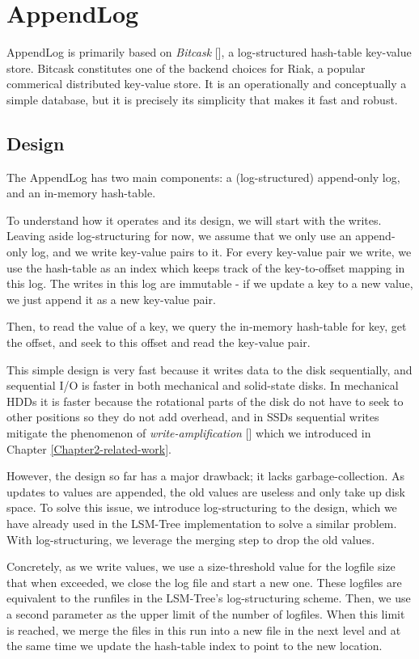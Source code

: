 \section{AppendLog}

AppendLog is primarily based on \textit{Bitcask} [\cite{bitcask}], a log-structured hash-table key-value store. Bitcask constitutes one of the backend choices for Riak, a popular commerical distributed key-value store. It is an operationally and conceptually a simple database, but it is precisely its simplicity that makes it fast and robust.

\subsection{Design}

The AppendLog has two main components: a (log-structured) append-only log, and an in-memory hash-table.

To understand how it operates and its design, we will start with the writes.
Leaving aside log-structuring for now, we assume that we only use an append-only log, and we write key-value pairs to it.
For every key-value pair we write, we use the hash-table as an index which keeps track of the key-to-offset mapping in this log. The writes in this log are immutable - if we update a key to a new value, we just append it as a new key-value pair.

Then, to read the value of a key, we query the in-memory hash-table for key, get the offset, and seek to this offset and read the key-value pair.

This simple design is very fast because it writes data to the disk sequentially, and sequential I/O is faster in both mechanical and solid-state disks. In mechanical HDDs it is faster because the rotational parts of the disk do not have to seek to other positions so they do not add overhead, and in SSDs sequential writes mitigate the phenomenon of \textit{write-amplification} [\cite{write-amplification}] which we introduced in Chapter \ref{Chapter2-related-work}.

However, the design so far has a major drawback; it lacks garbage-collection.
As updates to values are appended, the old values are useless and only take up disk space.
To solve this issue, we introduce log-structuring to the design, which we have already used in the LSM-Tree implementation to solve a similar problem.
With log-structuring, we leverage the merging step to drop the old values.

Concretely, as we write values, we use a size-threshold value for the logfile size that when exceeded, we close the log file and start a new one. These logfiles are equivalent to the runfiles in the LSM-Tree's log-structuring scheme.
Then, we use a second parameter as the upper limit of the number of logfiles.
When this limit is reached, we merge the files in this run into a new file in the next level and at the same time we update the hash-table index to point to the new location.

